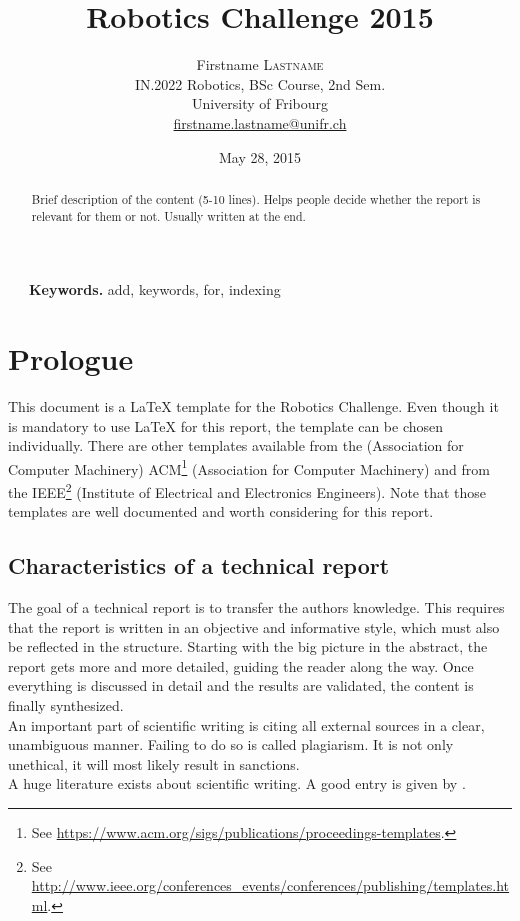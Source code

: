 \documentclass[12pt,a4paper]{article}
\title{Robotics Challenge 2015}
\date{May 28, 2015}
\author{
	Firstname \textsc{Lastname}\\
	IN.2022 Robotics, BSc Course, 2nd Sem.\\
	University of Fribourg \\
	\href{mailto:firstname.lastname@unifr.ch}{firstname.lastname@unifr.ch}
}
\begin{document}
\maketitle

\begin{abstract}
\noindent Brief description of the content (5-10 lines). Helps people decide whether the report is relevant for them or not. Usually written at the end.
\end{abstract}
~~~\indent \textbf{Keywords.} add, keywords, for, indexing

\section*{Prologue} %
This document is a \LaTeX{} template for the Robotics Challenge. Even though it is mandatory to use \LaTeX{} for this report, the template can be chosen individually. There are other templates available from the (Association for Computer Machinery) ACM\footnote{See \href{https://www.acm.org/sigs/publications/proceedings-templates}{https://www.acm.org/sigs/publications/proceedings-templates}.} (Association for Computer Machinery) and from the IEEE\footnote{See \href{http://www.ieee.org/conferences_events/conferences/publishing/templates.html}{http://www.ieee.org/conferences\_events/conferences/publishing/templates.html}.} (Institute of Electrical and Electronics Engineers). Note that those templates are well documented and worth considering for this report.\\
\subsection*{Characteristics of a technical report}
The goal of a technical report is to transfer the authors knowledge. This requires that the report is written in an objective and informative style, which must also be reflected in the structure. Starting with the big picture in the abstract, the report gets more and more detailed, guiding the reader along the way. Once everything is discussed in detail and the results are validated, the content is finally synthesized.\\
An important part of scientific writing is citing all external sources in a clear, unambiguous manner. Failing to do so is called plagiarism. It is not only unethical, it will most likely result in sanctions.\\
A huge literature exists about scientific writing. A good entry is given by \cite{Writing}.
\end{document}
